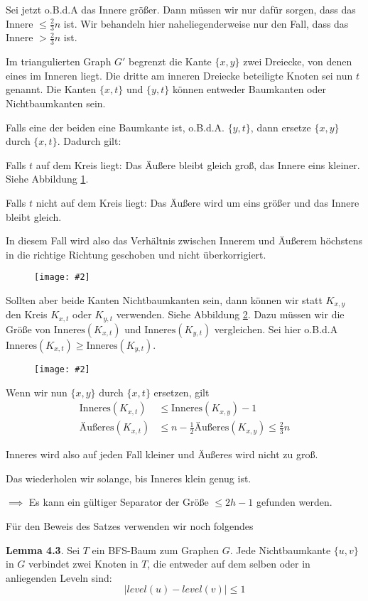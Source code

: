 \documentclass[10pt,a4paper]{article}
\makeatletter
\def\maxwidth#1{\ifdim\Gin@nat@width>#1 #1\else\Gin@nat@width\fi}
\newcommand{\imageFigure}[4]{%
    \begin{figure}[h]%
        \centering%
        {%
            \setlength{\fboxsep}{1pt}%
            \setlength{\fboxrule}{1pt}%
            \texttt{[image: \#2]}%
        }%
        \caption{#1}%
        \label{fig:#4}%
    \end{figure}%
}
\makeatother
\begin{document}
Sei jetzt o.B.d.A das Innere größer.
Dann müssen wir nur dafür sorgen, dass das Innere $\leq \frac{2}{3}n$ ist.
Wir behandeln hier naheliegenderweise nur den Fall, dass das Innere $>
\frac{2}{3}n$ ist.

Im triangulierten Graph $G'$ begrenzt die Kante $\{x, y\}$ zwei Dreiecke, von
denen eines im Inneren liegt.
Die dritte am inneren Dreiecke beteiligte Knoten sei nun $t$ genannt.
Die Kanten $\{x,t\}$ und $\{y,t\}$ können entweder Baumkanten oder
Nichtbaumkanten sein.

Falls eine der beiden eine Baumkante ist, o.B.d.A. $\{y, t\}$, dann ersetze
$\{x, y\}$ durch $\{x, t\}$.
Dadurch gilt:

Falls $t$ auf dem Kreis liegt:
Das Äußere bleibt gleich groß, das Innere eins kleiner.
Siehe Abbildung \ref{fig:pst-tree}.

Falls $t$ nicht auf dem Kreis liegt:
Das Äußere wird um eins größer und das Innere bleibt gleich.

In diesem Fall wird also das Verhältnis zwischen Innerem und Äußerem höchstens
in die richtige Richtung geschoben und nicht überkorrigiert.

\imageFigure{}{pst-tree.png}{.8}{pst-tree}

Sollten aber beide Kanten Nichtbaumkanten sein, dann können wir statt $K_{x,y}$
den Kreis $K_{x,t}$ oder $K_{y,t}$ verwenden.
Siehe Abbildung \ref{fig:pst-tree2}.
Dazu müssen wir die Größe von $\text{Inneres}(K_{x,t})$ und
$\text{Inneres}(K_{y,t})$ vergleichen.
Sei hier o.B.d.A $\text{Inneres}(K_{x,t}) \geq \text{Inneres}(K_{y,t})$.

\imageFigure{}{pst-tree2.png}{.4}{pst-tree2}

Wenn wir nun $\{x,y\}$ durch $\{x,t\}$ ersetzen, gilt
\begin{align*}
    \text{Inneres}(K_{x,t}) &\leq \text{Inneres}(K_{x,y}) - 1\\
    \text{Äußeres}(K_{x,t}) &\leq n - \frac{1}{2}\text{Äußeres}(K_{x,y}) \leq
    \frac{2}{3}n
\end{align*}

Inneres wird also auf jeden Fall kleiner und Äußeres wird nicht zu groß.

Das wiederholen wir solange, bis Inneres klein genug ist.

$\implies$ Es kann ein gültiger Separator der Größe $\leq 2h-1$ gefunden
werden.

Für den Beweis des Satzes verwenden wir noch folgendes

\textbf{Lemma 4.3}. Sei $T$ ein BFS-Baum zum Graphen $G$.
Jede Nichtbaumkante $\{u, v\}$ in $G$ verbindet zwei Knoten in $T$, die
entweder auf dem selben oder in anliegenden Leveln sind:
$$ |level(u) - level(v)| \leq 1 $$
\end{document}
